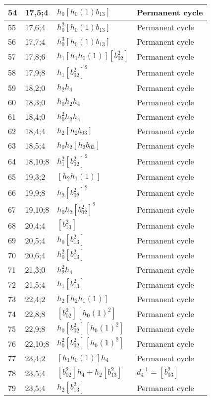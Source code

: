 \documentclass{article}
\begin{document}
\begin{longtable}{|l|l|>{\raggedright\arraybackslash}p{6cm}|>{\raggedright\arraybackslash}p{6cm}|}
\hline
54 & 17,5;4 & $h_0[h_0(1)b_{13}]$ & Permanent cycle\\
\hline
55 & 17,6;4 & $h_0^2[h_0(1)b_{13}]$ & Permanent cycle\\
\hline
56 & 17,7;4 & $h_0^3[h_0(1)b_{13}]$ & Permanent cycle\\
\hline
57 & 17,8;6 & $h_1[h_1h_0(1)][b_{02}^2]$ & Permanent cycle\\
\hline
58 & 17,9;8 & $h_1[b_{02}^2]^2$ & Permanent cycle\\
\hline
59 & 18,2;0 & $h_2h_4$ & Permanent cycle\\
\hline
60 & 18,3;0 & $h_0h_2h_4$ & Permanent cycle\\
\hline
61 & 18,4;0 & $h_0^2h_2h_4$ & Permanent cycle\\
\hline
62 & 18,4;4 & $h_2[h_2b_{03}]$ & Permanent cycle\\
\hline
63 & 18,5;4 & $h_0h_2[h_2b_{03}]$ & Permanent cycle\\
\hline
64 & 18,10;8 & $h_1^2[b_{02}^2]^2$ & Permanent cycle\\
\hline
65 & 19,3;2 & $[h_2h_1(1)]$ & Permanent cycle\\
\hline
66 & 19,9;8 & $h_2[b_{02}^2]^2$ & Permanent cycle\\
\hline
67 & 19,10;8 & $h_0h_2[b_{02}^2]^2$ & Permanent cycle\\
\hline
68 & 20,4;4 & $[b_{13}^2]$ & Permanent cycle\\
\hline
69 & 20,5;4 & $h_0[b_{13}^2]$ & Permanent cycle\\
\hline
70 & 20,6;4 & $h_0^2[b_{13}^2]$ & Permanent cycle\\
\hline
71 & 21,3;0 & $h_2^2h_4$ & Permanent cycle\\
\hline
72 & 21,5;4 & $h_1[b_{13}^2]$ & Permanent cycle\\
\hline
73 & 22,4;2 & $h_2[h_2h_1(1)]$ & Permanent cycle\\
\hline
74 & 22,8;8 & $[b_{02}^2][h_0(1)^2]$ & Permanent cycle\\
\hline
75 & 22,9;8 & $h_0[b_{02}^2][h_0(1)^2]$ & Permanent cycle\\
\hline
76 & 22,10;8 & $h_0^2[b_{02}^2][h_0(1)^2]$ & Permanent cycle\\
\hline
77 & 23,4;2 & $[h_1h_0(1)]h_4$ & Permanent cycle\\
\hline
78 & 23,5;4 & $[b_{02}^2]h_4 + h_2[b_{13}^2]$ & $d_{4}^{-1}=[b_{03}^2]$\\
79 & 23,5;4 & $h_2[b_{13}^2]$ & Permanent cycle\\
\hline

\end{longtable}
\end{document}
